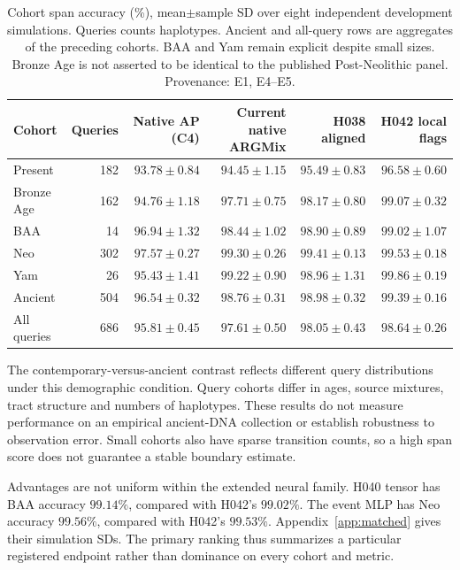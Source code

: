 \documentclass[letterpaper]{article}
\begin{document}
\begin{table}[t]
\centering
\small
\begin{tabular}{lrrrrr}
\toprule
Cohort & Queries & Native AP (C4) & Current native ARGMix & H038 aligned & H042 local flags \\
\midrule
Present & 182 & $93.78\pm0.84$ & $94.45\pm1.15$ & $95.49\pm0.83$ & $96.58\pm0.60$ \\
Bronze Age & 162 & $94.76\pm1.18$ & $97.71\pm0.75$ & $98.17\pm0.80$ & $99.07\pm0.32$ \\
BAA & 14 & $96.94\pm1.32$ & $98.44\pm1.02$ & $98.90\pm0.89$ & $99.02\pm1.07$ \\
Neo & 302 & $97.57\pm0.27$ & $99.30\pm0.26$ & $99.41\pm0.13$ & $99.53\pm0.18$ \\
Yam & 26 & $95.43\pm1.41$ & $99.22\pm0.90$ & $98.96\pm1.31$ & $99.86\pm0.19$ \\
Ancient & 504 & $96.54\pm0.32$ & $98.76\pm0.31$ & $98.98\pm0.32$ & $99.39\pm0.16$ \\
All queries & 686 & $95.81\pm0.45$ & $97.61\pm0.50$ & $98.05\pm0.43$ & $98.64\pm0.26$ \\
\bottomrule
\end{tabular}
\caption{Cohort span accuracy (\%), mean$\pm$sample SD over eight independent development simulations. Queries counts haplotypes. Ancient and all-query rows are aggregates of the preceding cohorts. BAA and Yam remain explicit despite small sizes. Bronze Age is not asserted to be identical to the published Post-Neolithic panel. Provenance: E1, E4--E5.}
\label{tab:cohorts}
\end{table}


The contemporary-versus-ancient contrast reflects different query distributions under this demographic condition. Query cohorts differ in ages, source mixtures, tract structure and numbers of haplotypes. These results do not measure performance on an empirical ancient-DNA collection or establish robustness to observation error. Small cohorts also have sparse transition counts, so a high span score does not guarantee a stable boundary estimate.

Advantages are not uniform within the extended neural family. H040 tensor has BAA accuracy $99.14\%$, compared with H042's $99.02\%$. The event MLP has Neo accuracy $99.56\%$, compared with H042's $99.53\%$. Appendix~\ref{app:matched} gives their simulation SDs. The primary ranking thus summarizes a particular registered endpoint rather than dominance on every cohort and metric.
\end{document}
